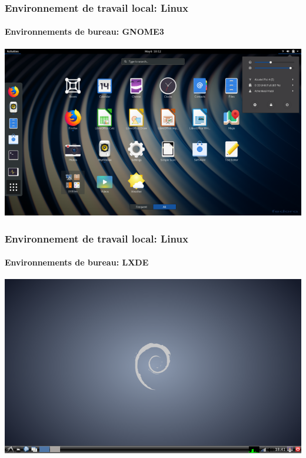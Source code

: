 \documentclass[xcolor=table]{beamer}
\begin{document}
\begin{frame}
\frametitle{Environnement de travail local: Linux}
\framesubtitle{Environnements de bureau: GNOME3}

\begin{center}
	\includegraphics[height=
.8\textheight]{../img/Bweb01-environnement/gnome.png}
\end{center}

\end{frame}

\begin{frame}
\frametitle{Environnement de travail local: Linux}
\framesubtitle{Environnements de bureau: LXDE}

\begin{center}
	\includegraphics[height=
.8\textheight]{../img/Bweb01-environnement/lxde.png}
\end{center}

\end{frame}
\end{document}
